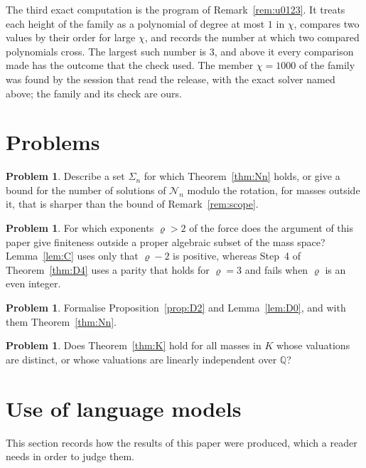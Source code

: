 \documentclass[11pt]{amsart}
\theoremstyle{definition}
\newtheorem{problem}[theorem]{Problem}
\theoremstyle{remark}
\numberwithin{equation}{section}
\newcommand{\repo}[1]{\texttt{\detokenize{#1}}}
\newcommand{\QQ}{\mathbb{Q}}
\newcommand{\cN}{\mathcal{N}}
\begin{document}
The third exact computation is the program \repo{scripts/allN/wd_u0123_check.py} of
Remark~\ref{rem:u0123}. It treats each height of the family as a polynomial of degree at most $1$ in
$\chi$, compares two values by their order for large $\chi$, and records the number at which two
compared polynomials cross. The largest such number is $3$, and above it every comparison made has the
outcome that the check used. The member $\chi = 1000$ of the family was found by the session that read
the release, with the exact solver named above; the family and its check are ours.

\section{Problems}\label{sec:problems}

\begin{problem}
Describe a set $\Sigma_n$ for which Theorem~\ref{thm:Nn} holds, or give a bound for the number of
solutions of $\cN_n$ modulo the rotation, for masses outside it, that is sharper than the bound of
Remark~\ref{rem:scope}.
\end{problem}

\begin{problem}
For which exponents $\varrho > 2$ of the force does the argument of this paper give finiteness outside
a proper algebraic subset of the mass space? Lemma~\ref{lem:C} uses only that $\varrho - 2$ is positive,
whereas Step~4 of Theorem~\ref{thm:D4} uses a parity that holds for $\varrho = 3$ and fails when
$\varrho$ is an even integer.
\end{problem}

\begin{problem}
Formalise Proposition~\ref{prop:D2} and Lemma~\ref{lem:D0}, and with them Theorem~\ref{thm:Nn}.
\end{problem}

\begin{problem}
Does Theorem~\ref{thm:K} hold for all masses in $K$ whose valuations are distinct, or whose valuations
are linearly independent over $\QQ$?
\end{problem}

\section{Use of language models}\label{sec:llm}

This section records how the results of this paper were produced, which a reader needs in order to
judge them.
\end{document}
